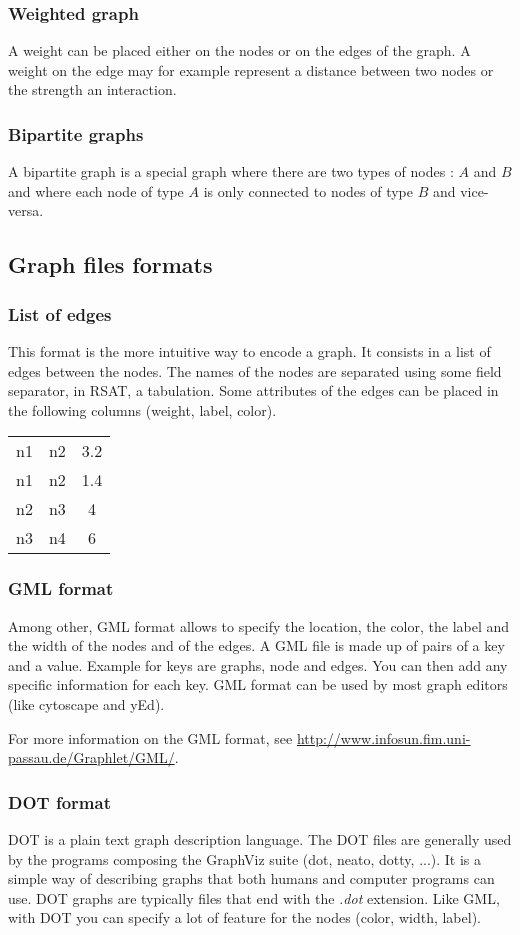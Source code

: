 \subsubsection{Weighted graph}
A weight can be placed either on the nodes or on the edges of the graph. A weight on the edge may for example represent a distance between two nodes or the strength an interaction.
\subsubsection{Bipartite graphs}
A bipartite graph is a special graph where there are two types of nodes : $A$ and $B$ and where each node of type $A$ is only connected to nodes of type $B$ and vice-versa.

\subsection{Graph files formats}
\subsubsection{List of edges}
This format is the more intuitive way to encode a graph. It consists in a list of edges between the nodes. The names of the nodes are separated using some field separator, in RSAT, a tabulation. Some attributes of the edges can be placed in the following columns (weight, label, color).

\begin{tabular}{ccc}
n1 & n2 & 3.2 \\
n1 & n2 & 1.4 \\
n2 & n3 & 4 \\
n3 & n4 & 6 \\
\end{tabular}

\subsubsection{GML format}
Among other, GML format allows to specify the location, the color, the label and the width of the nodes and of the edges. A GML file is made up of pairs of a key and a value. Example for keys are graphs, node and edges. You can then add any specific information for each key.
GML format can be used by most graph editors (like cytoscape and yEd).

For more information on the GML format, see \url{http://www.infosun.fim.uni-passau.de/Graphlet/GML/}.

\subsubsection{DOT format}
DOT is a plain text graph description language. The DOT files are generally used by the programs composing the GraphViz suite (dot, neato, dotty, ...). It is a simple way of describing graphs that both humans and computer programs can use. DOT graphs are typically files that end with the \textit{.dot} extension. Like GML, with DOT you can specify a lot of feature for the nodes (color, width, label). 

